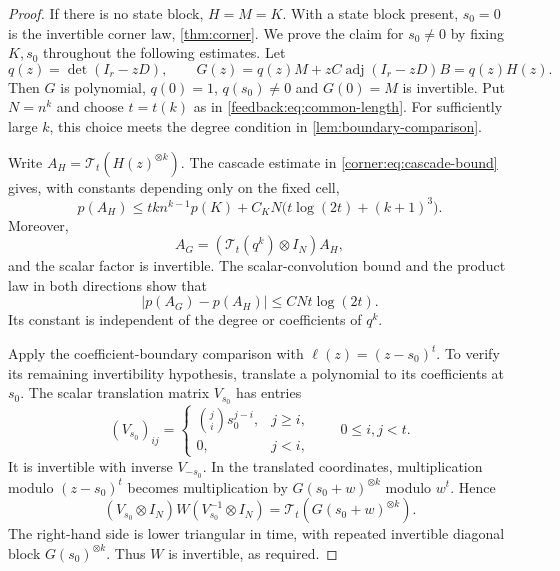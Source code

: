 \begin{proof}
If there is no state block, $H=M=K$.  With a state block present,
$s_0=0$ is the invertible corner law, \cref{thm:corner}.  We prove the
claim for $s_0\ne0$ by fixing $K,s_0$ throughout the following estimates.
Let
\[
 q(z)=\det(I_r-zD),\qquad
 G(z)=q(z)M+zC\operatorname{adj}(I_r-zD)B=q(z)H(z).
\]
Then $G$ is polynomial, $q(0)=1$, $q(s_0)\ne0$ and $G(0)=M$ is
invertible.  Put $N=n^k$ and choose $t=t(k)$ as in
\cref{feedback:eq:common-length}.  For sufficiently large $k$, this
choice meets the degree condition in \cref{lem:boundary-comparison}.

Write $A_H=\mathcal T_t(H(z)^{\otimes k})$.  The cascade estimate in
\cref{corner:eq:cascade-bound} gives, with constants depending only
on the fixed cell,
\begin{equation}
 p(A_H)\leq tk n^{k-1}p(K)
     +C_KN\bigl(t\log(2t)+(k+1)^3\bigr).
 \label{feedback:eq:cascade-use}
\end{equation}
Moreover,
\[
 A_G=(\mathcal T_t(q^k)\otimes I_N)A_H,
\]
and the scalar factor is invertible.  The scalar-convolution bound
and the product law in both directions show that
\begin{equation}
 |p(A_G)-p(A_H)|\leq C N t\log(2t).
 \label{feedback:eq:clear-denominator-cost}
\end{equation}
Its constant is independent of the degree or coefficients of $q^k$.

Apply the coefficient-boundary comparison with
$\ell(z)=(z-s_0)^t$.  To verify its remaining invertibility hypothesis,
translate a polynomial to its coefficients at $s_0$.  The scalar
translation matrix $V_{s_0}$ has entries
\[
 (V_{s_0})_{ij}=
 \begin{cases}\binom ji s_0^{j-i},&j\geq i,\\0,&j<i,
 \end{cases}
 \qquad 0\leq i,j<t.
\]
It is invertible with inverse $V_{-s_0}$.  In the translated
coordinates, multiplication modulo $(z-s_0)^t$ becomes multiplication
by $G(s_0+w)^{\otimes k}$ modulo $w^t$.  Hence
\begin{equation}
 (V_{s_0}\otimes I_N)W(V_{s_0}^{-1}\otimes I_N)
   =\mathcal T_t(G(s_0+w)^{\otimes k}).
 \label{feedback:eq:taylor-conjugacy}
\end{equation}
The right-hand side is lower triangular in time, with repeated
invertible diagonal block $G(s_0)^{\otimes k}$.  Thus $W$ is
invertible, as required.


\end{proof}
